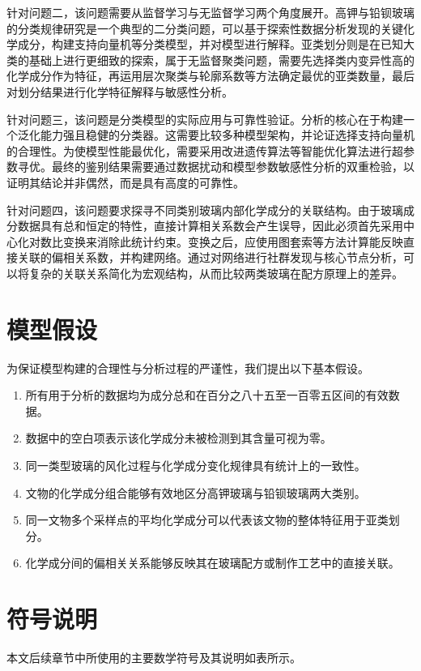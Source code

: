 针对问题二，该问题需要从监督学习与无监督学习两个角度展开。高钾与铅钡玻璃的分类规律研究是一个典型的二分类问题，可以基于探索性数据分析发现的关键化学成分，构建支持向量机等分类模型，并对模型进行解释。亚类划分则是在已知大类的基础上进行更细致的探索，属于无监督聚类问题，需要先选择类内变异性高的化学成分作为特征，再运用层次聚类与轮廓系数等方法确定最优的亚类数量，最后对划分结果进行化学特征解释与敏感性分析。

针对问题三，该问题是分类模型的实际应用与可靠性验证。分析的核心在于构建一个泛化能力强且稳健的分类器。这需要比较多种模型架构，并论证选择支持向量机的合理性。为使模型性能最优化，需要采用改进遗传算法等智能优化算法进行超参数寻优。最终的鉴别结果需要通过数据扰动和模型参数敏感性分析的双重检验，以证明其结论并非偶然，而是具有高度的可靠性。

针对问题四，该问题要求探寻不同类别玻璃内部化学成分的关联结构。由于玻璃成分数据具有总和恒定的特性，直接计算相关系数会产生误导，因此必须首先采用中心化对数比变换来消除此统计约束。变换之后，应使用图套索等方法计算能反映直接关联的偏相关系数，并构建网络。通过对网络进行社群发现与核心节点分析，可以将复杂的关联关系简化为宏观结构，从而比较两类玻璃在配方原理上的差异。


\section{模型假设}
为保证模型构建的合理性与分析过程的严谨性，我们提出以下基本假设。
\begin{enumerate}
    \item 所有用于分析的数据均为成分总和在百分之八十五至一百零五区间的有效数据。
    \item 数据中的空白项表示该化学成分未被检测到其含量可视为零。
    \item 同一类型玻璃的风化过程与化学成分变化规律具有统计上的一致性。
    \item 文物的化学成分组合能够有效地区分高钾玻璃与铅钡玻璃两大类别。
    \item 同一文物多个采样点的平均化学成分可以代表该文物的整体特征用于亚类划分。
    \item 化学成分间的偏相关关系能够反映其在玻璃配方或制作工艺中的直接关联。
\end{enumerate}

\section{符号说明}
本文后续章节中所使用的主要数学符号及其说明如表所示。

